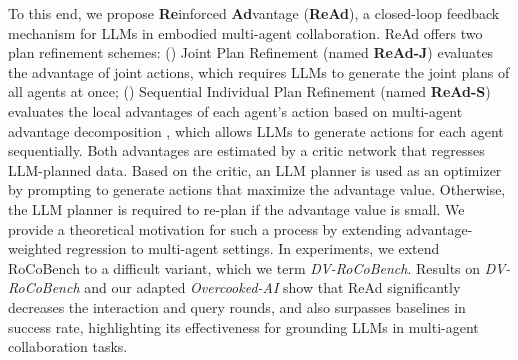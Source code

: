 \documentclass[11pt]{article}
\theoremstyle{plain}
\theoremstyle{remark}
\begin{document}
To this end, we propose {\bf Re}inforced {\bf Ad}vantage (\textbf{ReAd}), a closed-loop feedback mechanism for LLMs in embodied multi-agent collaboration. ReAd offers two plan refinement schemes: () Joint Plan Refinement (named \textbf{ReAd-J}) evaluates the advantage of joint actions, which requires LLMs to generate the joint plans of all agents at once; () Sequential Individual Plan Refinement (named \textbf{ReAd-S}) evaluates the local advantages of each agent’s action based on multi-agent advantage decomposition \citep{kuba2022happo}, which allows LLMs to generate actions for each agent sequentially.
Both advantages are estimated by a critic network that regresses LLM-planned data. Based on the critic, an LLM planner is used as an optimizer by prompting to generate actions that maximize the advantage value. Otherwise, the LLM planner is required to re-plan if the advantage value is small. We provide a theoretical motivation for such a process by extending advantage-weighted regression \citep{peng2019advantageweighted} to multi-agent settings.
In experiments, we extend RoCoBench \citep{mandi2023roco} to a difficult variant, which we term \emph{DV-RoCoBench}.
Results on \emph{DV-RoCoBench} and our adapted \emph{Overcooked-AI} show that ReAd significantly decreases the interaction and query rounds, and also surpasses baselines in success rate, highlighting its effectiveness for grounding LLMs in multi-agent collaboration tasks.
\end{document}
